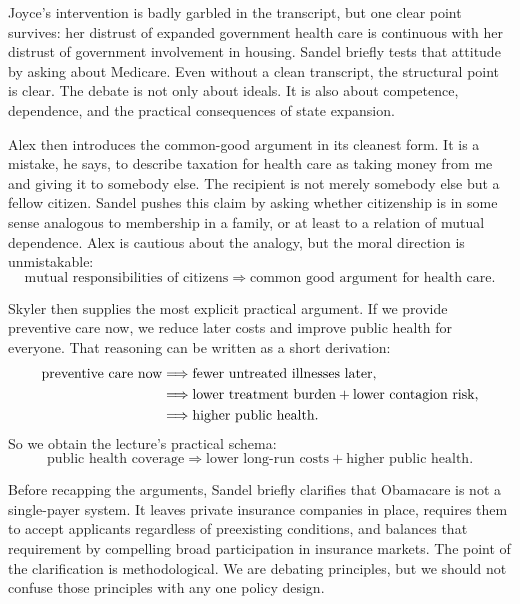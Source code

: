 Joyce's intervention is badly garbled in the transcript, but one clear point survives: her distrust of expanded government health care is continuous with her distrust of government involvement in housing. Sandel briefly tests that attitude by asking about Medicare. Even without a clean transcript, the structural point is clear. The debate is not only about ideals. It is also about competence, dependence, and the practical consequences of state expansion.

Alex then introduces the common-good argument in its cleanest form. It is a mistake, he says, to describe taxation for health care as taking money from me and giving it to somebody else. The recipient is not merely somebody else but a fellow citizen. Sandel pushes this claim by asking whether citizenship is in some sense analogous to membership in a family, or at least to a relation of mutual dependence. Alex is cautious about the analogy, but the moral direction is unmistakable:
\begin{equation}
\text{mutual responsibilities of citizens}
\Longrightarrow
\text{common good argument for health care}.
\end{equation}

Skyler then supplies the most explicit practical argument. If we provide preventive care now, we reduce later costs and improve public health for everyone. That reasoning can be written as a short derivation:
\begin{align}
\text{preventive care now}
&\Longrightarrow
\text{fewer untreated illnesses later}, \notag\\
&\Longrightarrow
\text{lower treatment burden} + \text{lower contagion risk}, \notag\\
&\Longrightarrow
\text{higher public health}.
\end{align}
So we obtain the lecture's practical schema:
\begin{equation}
\text{public health coverage}
\Longrightarrow
\text{lower long-run costs} + \text{higher public health}.
\end{equation}

Before recapping the arguments, Sandel briefly clarifies that Obamacare is not a single-payer system. It leaves private insurance companies in place, requires them to accept applicants regardless of preexisting conditions, and balances that requirement by compelling broad participation in insurance markets. The point of the clarification is methodological. We are debating principles, but we should not confuse those principles with any one policy design.

